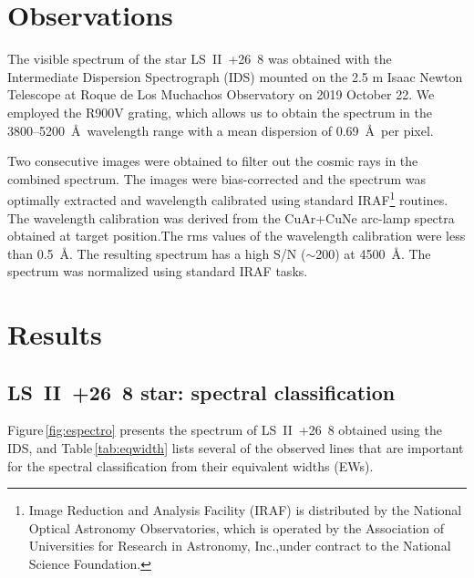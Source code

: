 \documentclass[fleqn,usenatbib]{mnras}
\begin{document}
\section{Observations}

The visible spectrum of the star LS~II~+26~8 was obtained with the Intermediate Dispersion 
Spectrograph (IDS) mounted on the 2.5 m Isaac Newton Telescope at Roque de Los Muchachos 
Observatory on 2019 October 22. We employed the R900V grating, which allows us to obtain 
the spectrum in the 3800--5200~\AA~wavelength range with a mean dispersion of 0.69~\AA~per pixel.

Two consecutive images were obtained to filter out the cosmic rays in the combined spectrum. 
The images were  bias-corrected and the spectrum was optimally extracted and wavelength calibrated
using standard IRAF\footnote{Image Reduction and Analysis Facility (IRAF) is distributed by 
the National Optical Astronomy Observatories, which is operated by the Association of Universities 
for Research in Astronomy, Inc.,under contract to the National Science Foundation.} routines. 
The wavelength calibration was derived from the CuAr+CuNe arc-lamp spectra obtained at target 
position.The rms values of the wavelength calibration were less than 0.5~\AA. The resulting 
spectrum has a high S/N ($\sim$200) at 4500~\AA. The spectrum was normalized using standard IRAF tasks. 


\section{Results}

\subsection{LS~II~+26~8 star: spectral classification}

Figure\,\ref{fig:espectro} presents the spectrum of LS~II~+26~8 obtained using the 
IDS, and Table\,\ref{tab:eqwidth} lists several of the observed lines that are important for 
the spectral classification from their equivalent widths (EWs). 
\end{document}
